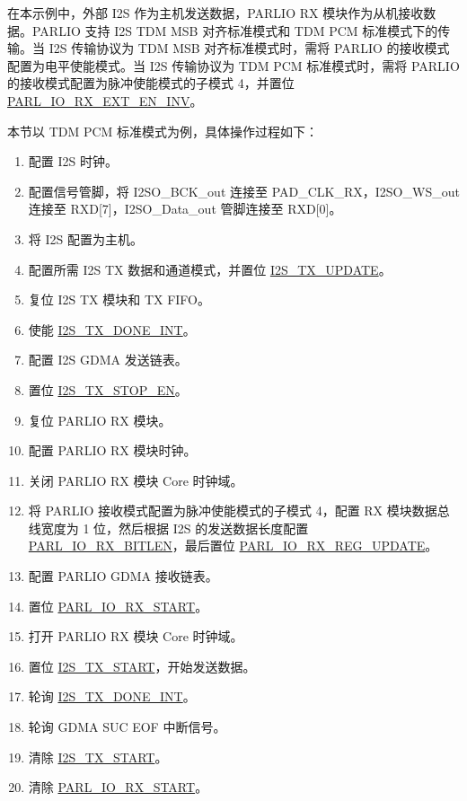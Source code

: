 \documentclass[main\_\_CN.tex]{subfiles}
\begin{document}
在本示例中，外部 I2S 作为主机发送数据，PARLIO RX 模块作为从机接收数据。PARLIO 支持 I2S TDM MSB 对齐标准模式和 TDM PCM 标准模式下的传输。当 I2S 传输协议为 TDM MSB 对齐标准模式时，需将 PARLIO 的接收模式配置为电平使能模式。当 I2S 传输协议为 TDM PCM 标准模式时，需将 PARLIO 的接收模式配置为脉冲使能模式的子模式 4，并置位 \hyperref[fielddesc:PARLIORXEXTENINV]{PARL\_IO\_RX\_EXT\_EN\_INV}。

本节以 TDM PCM 标准模式为例，具体操作过程如下：

\begin{enumerate}
    \item 配置 I2S 时钟。
    \item 配置信号管脚，将 I2SO\_BCK\_out 连接至 PAD\_CLK\_RX，I2SO\_WS\_out 连接至 RXD[7]，I2SO\_Data\_out 管脚连接至 RXD[0]。
    \item 将 I2S 配置为主机。
    \item 配置所需 I2S TX 数据和通道模式，并置位 \hyperref[fielddesc:I2STXUPDATE]{I2S\_TX\_UPDATE}。
    \item 复位 I2S TX 模块和 TX FIFO。
    \item 使能 \hyperref[int:I2STXDONEINT]{I2S\_TX\_DONE\_INT}。 
    \item 配置 I2S GDMA 发送链表。
    \item 置位 \hyperref[fielddesc:I2STXSTOPEN]{I2S\_TX\_STOP\_EN}。
    \item 复位 PARLIO RX 模块。
    \item 配置 PARLIO RX 模块时钟。
    \item 关闭 PARLIO RX 模块 Core 时钟域。
    \item 将 PARLIO 接收模式配置为脉冲使能模式的子模式 4，配置 RX 模块数据总线宽度为 1 位，然后根据 I2S 的发送数据长度配置 \hyperref[fielddesc:PARLIORXBITLEN]{PARL\_IO\_RX\_BITLEN}，最后置位 \hyperref[fielddesc:PARLIORXREGUPDATE]{PARL\_IO\_RX\_REG\_UPDATE}。
    \item 配置 PARLIO GDMA 接收链表。
    \item 置位 \hyperref[fielddesc:PARLIORXSTART]{PARL\_IO\_RX\_START}。
    \item 打开 PARLIO RX 模块 Core 时钟域。
    \item 置位 \hyperref[fielddesc:I2STXSTART]{I2S\_TX\_START}，开始发送数据。
    \item 轮询 \hyperref[int:I2STXDONEINT]{I2S\_TX\_DONE\_INT}。 
    \item 轮询 GDMA SUC EOF 中断信号。
    \item 清除 \hyperref[fielddesc:I2STXSTART]{I2S\_TX\_START}。
    \item 清除 \hyperref[fielddesc:PARLIORXSTART]{PARL\_IO\_RX\_START}。
\end{enumerate}
\end{document}
